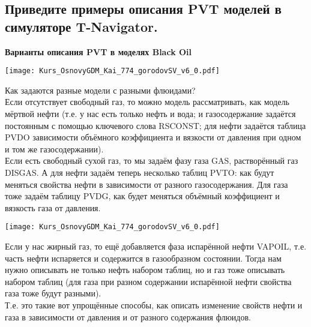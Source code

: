 

\subsection{Приведите примеры описания PVT моделей в симуляторе T-Navigator.}

\textbf{Варианты описания PVT в моделях Black Oil}

\texttt{[image: Kurs\_OsnovyGDM\_Kai\_774\_gorodovSV\_v6\_0.pdf]}

Как задаются разные модели с разными флюидами?
\\

Если отсутствует свободный газ, то можно модель рассматривать, как модель мёртвой нефти (т.е. у нас есть только нефть и вода; и газосодержание задаётся постоянным с помощью ключевого слова RSCONST; для нефти задаётся таблица PVDO зависимости объёмного коэффициента и вязкости от давления при одном и том же газосодержании).
\\

Если есть свободный сухой газ, то мы задаём фазу газа GAS, растворённый газ DISGAS.
А для нефти задаём теперь несколько таблиц PVTO: как будут меняться свойства нефти в зависимости от разного газосодержания.
Для газа тоже задаём таблицу PVDG, как будет меняться объёмный коэффициент и вязкость газа от давления.

\texttt{[image: Kurs\_OsnovyGDM\_Kai\_774\_gorodovSV\_v6\_0.pdf]}

Если у нас жирный газ, то ещё добавляется фаза испарённой нефти VAPOIL, т.е. часть нефти испаряется и содержится в газообразном состоянии.
Тогда нам нужно описывать не только нефть набором таблиц, но и газ тоже описывать набором таблиц (для газа при разном содержании испарённой нефти свойства газа тоже будут разными).
\\

Т.е. это такие вот упрощённые способы, как описать изменение свойств нефти и газа в зависимости от давления и от разного содержания флюидов.


